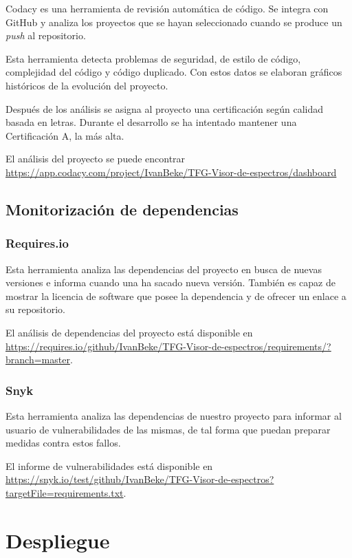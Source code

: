 Codacy es una herramienta de revisión automática de código. Se integra con
GitHub y analiza los proyectos que se hayan seleccionado cuando se produce un
\textit{push} al repositorio.

Esta herramienta detecta problemas de seguridad, de estilo de código,
complejidad del código y código duplicado. Con estos datos se elaboran
gráficos históricos de la evolución del proyecto.

Después de los análisis se asigna al proyecto una certificación según calidad
basada en letras. Durante el desarrollo se ha intentado mantener una
Certificación A, la más alta. 

El análisis del proyecto se puede encontrar
\url{https://app.codacy.com/project/IvanBeke/TFG-Visor-de-espectros/dashboard}

\subsection{Monitorización de dependencias}

\subsubsection{Requires.io}

Esta herramienta analiza las dependencias del proyecto en busca de nuevas
versiones e informa cuando una ha sacado nueva versión. También es capaz de
mostrar la licencia de software que posee la dependencia y de ofrecer un enlace
a su repositorio.

El análisis de dependencias del proyecto está disponible en
\url{https://requires.io/github/IvanBeke/TFG-Visor-de-espectros/requirements/?branch=master}.

\subsubsection{Snyk}

Esta herramienta analiza las dependencias de nuestro proyecto para informar al
usuario de vulnerabilidades de las mismas, de tal forma que puedan preparar
medidas contra estos fallos.

El informe de vulnerabilidades está disponible en
\url{https://snyk.io/test/github/IvanBeke/TFG-Visor-de-espectros?targetFile=requirements.txt}.

\section{Despliegue}

